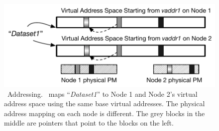 {
\begin{figure}[th]
\begin{center}
\centerline{\includegraphics[width=\textwidth]{hotpot/Figures/addressing.pdf}}
\caption[\hotpot\ Addressing.]
{\hotpot\ Addressing.
\hotpot\ maps ``{\em Dataset1}'' to Node 1 and Node 2's virtual address space using the 
same base virtual addresses. The physical address mapping on each node is different.
The grey blocks in the middle are pointers that point to the blocks on the left. 
}
\label{fig-hotpot-addressing}
\end{center}
\end{figure}
}